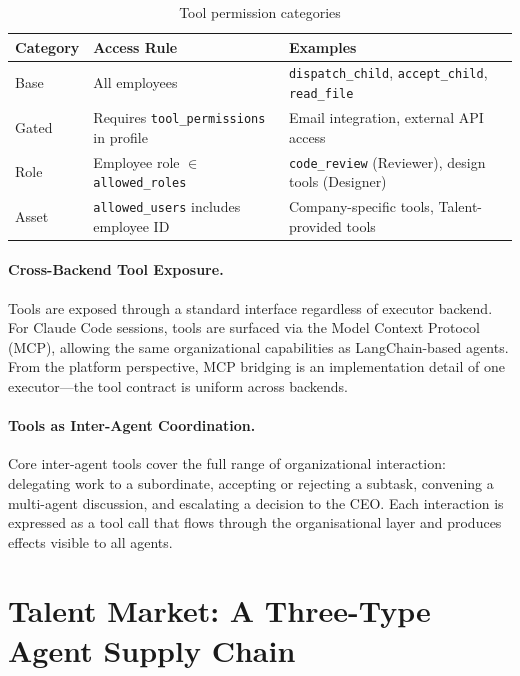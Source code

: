 \begin{table}[H]
\centering
\caption{Tool permission categories}
\label{tab:tools}
\small
\setlength{\tabcolsep}{4pt}
\begin{tabularx}{\textwidth}{@{}>{\raggedright\arraybackslash}p{}>{\raggedright\arraybackslash}p{}X@{}}
\toprule
\textbf{Category} & \textbf{Access Rule} & \textbf{Examples} \\
\midrule
Base & All employees & \texttt{dispatch\_child}, \texttt{accept\_child}, \texttt{read\_file} \\
Gated & Requires \texttt{tool\_permissions} in profile & Email integration, external API access \\
Role & Employee role $\in$ \texttt{allowed\_roles} & \texttt{code\_review} (Reviewer), design tools (Designer) \\
Asset & \texttt{allowed\_users} includes employee ID & Company-specific tools, Talent-provided tools \\
\bottomrule
\end{tabularx}
\end{table}

\paragraph{Cross-Backend Tool Exposure.}
Tools are exposed through a standard interface regardless of executor backend. For Claude Code sessions, tools are surfaced via the Model Context Protocol (MCP), allowing the same organizational capabilities as LangChain-based agents. From the platform perspective, MCP bridging is an implementation detail of one executor---the tool contract is uniform across backends.

\paragraph{Tools as Inter-Agent Coordination.}
Core inter-agent tools cover the full range of organizational interaction: delegating work to a subordinate, accepting or rejecting a subtask, convening a multi-agent discussion, and escalating a decision to the CEO. Each interaction is expressed as a tool call that flows through the organisational layer and produces effects visible to all agents.

\section{Talent Market: A Three-Type Agent Supply Chain}
\label{sec:talent-supply}

